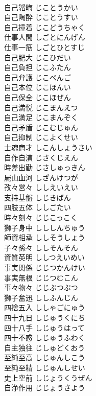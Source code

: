 \documentclass[8pt]{extreport}
\begin{document}
\begin{CJK}{UTF8}{min}
\\	自己韜晦	じことうかい	
\\	自己陶酔	じことうすい	
\\	自己撞着	じこどうちゃく	
\\	仕事人間	しごとにんげん	
\\	仕事一筋	しごとひとすじ	
\\	自己肥大	じこひだい	
\\	自己負担	じこふたん	
\\	自己弁護	じこべんご	
\\	自己本位	じこほんい	
\\	自己保全	じこほぜん	
\\	自己満悦	じこまんえつ	
\\	自己満足	じこまんぞく	
\\	自己矛盾	じこむじゅん	
\\	自己抑制	じこよくせい	
\\	士魂商才	しこんしょうさい	
\\	自作自演	じさくじえん	
\\	時差出勤	じさしゅっきん	
\\	屍山血河	しざんけつが	
\\	孜々営々	ししえいえい	
\\	支持基盤	しじきばん	
\\	四肢五体	ししごたい	
\\	時々刻々	じじこっこく	
\\	獅子身中	しししんちゅう	
\\	師資相承	ししそうしょう	
\\	子々孫々	ししそんそん	
\\	資質英明	ししつえいめい	
\\	事実関係	じじつかんけい	
\\	事実無根	じじつむこん	
\\	事々物々	じじぶつぶつ	
\\	獅子奮迅	ししふんじん	
\\	四捨五入	ししゃごにゅう	
\\	四十九日	しじゅうくにち	
\\	四十八手	しじゅうはって	
\\	四十不惑	しじゅうふわく	
\\	自主独往	じしゅどくおう	
\\	至純至高	しじゅんしこう	
\\	至純至精	しじゅんしせい	
\\	史上空前	しじょうくうぜん	
\\	自浄作用	じじょうさよう	

\end{CJK}
\end{document}
